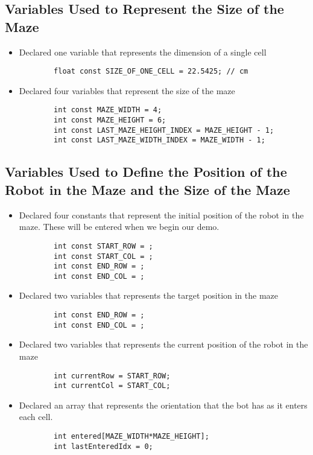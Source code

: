\documentclass[11pt]{article}
\begin{document}
\subsection{Variables Used to Represent the Size of the Maze}
\begin{itemize}
\item Declared one variable that represents the dimension of a single cell
	\begin{verbatim}
		float const SIZE_OF_ONE_CELL = 22.5425; // cm 	
	\end{verbatim} 
\item Declared four variables that represent the size of the maze
	\begin{verbatim}
		int const MAZE_WIDTH = 4;
		int const MAZE_HEIGHT = 6;
		int const LAST_MAZE_HEIGHT_INDEX = MAZE_HEIGHT - 1;
		int const LAST_MAZE_WIDTH_INDEX = MAZE_WIDTH - 1;
	\end{verbatim} 
\end{itemize}
\subsection{Variables Used to Define the Position of the Robot in the Maze and the Size of the Maze}
\begin{itemize}
\item Declared four constants that represent the initial position of the robot in the maze. These will be entered when we begin our demo.
	\begin{verbatim}
		int const START_ROW = ;
		int const START_COL = ;
		int const END_ROW = ; 
		int const END_COL = ;
	\end{verbatim} 
\item Declared two variables that represents the target position in the maze
	\begin{verbatim}
		int const END_ROW = ; 
		int const END_COL = ;
	\end{verbatim}
\item Declared two variables that represents the current position of the robot in the maze 
	\begin{verbatim}
		int currentRow = START_ROW;
		int currentCol = START_COL;
	\end{verbatim} 
\item Declared an array that represents the orientation that the bot has as it enters each cell. 
	\begin{verbatim}
		int entered[MAZE_WIDTH*MAZE_HEIGHT];
		int lastEnteredIdx = 0;
	\end{verbatim} 
\end{itemize}
\newpage
\end{document}

